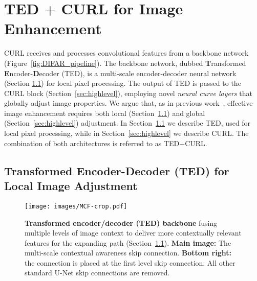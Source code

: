 \documentclass[a4paper,conference]{IEEEtran}
\begin{document}
\section{TED $+$ CURL for Image Enhancement}\label{sec:methods}

CURL receives and processes convolutional features from a backbone network (Figure~\ref{fig:DIFAR_pipeline}). The backbone network, dubbed \textbf{T}ransformed \textbf{E}ncoder-\textbf{D}ecoder (TED), is a multi-scale encoder-decoder neural network (Section \ref{sec:lowlevel}) for local pixel processing. The output of TED is passed to the CURL block  (Section~\ref{sec:highlevel}), employing  novel \emph{neural curve layers} that globally adjust image properties. We argue that, as in previous work~\cite{schwartz19,Chen2018DPE}, effective image enhancement requires both local (Section~\ref{sec:lowlevel}) and global (Section~\ref{sec:highlevel}) adjustment. In Section~\ref{sec:lowlevel} we describe TED,  used for local pixel processing, while in Section~\ref{sec:highlevel} we describe CURL. The combination of both architectures is referred to as TED$+$CURL.

\subsection{Transformed Encoder-Decoder (TED) for Local Image Adjustment}
\label{sec:lowlevel}

\begin{figure}[t!]
\begin{center}
\texttt{[image: images/MCF-crop.pdf]}
\end{center}
\caption{\textbf{Transformed encoder/decoder (TED) backbone} fusing multiple levels of image context to deliver more contextually relevant features for the expanding path (Section~\ref{sec:lowlevel}). \textbf{Main image:} The multi-scale contextual awareness skip connection. \textbf{Bottom right:} the connection is placed at the first level skip connection. All other standard U-Net skip connections are removed.}
\label{fig:fusion_block}
\end{figure} 
\end{document}
